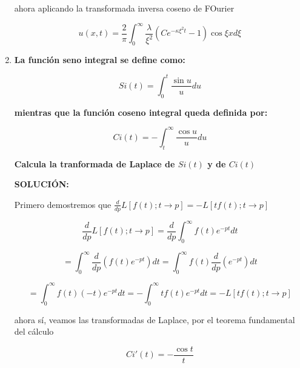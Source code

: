 \documentclass[12pt,a4paper]{article}
\begin{document}
\begin{enumerate}
    ahora aplicando la transformada inversa coseno de FOurier
    
    \begin{equation*}
        u(x,t)=\frac{2}{\pi}\int_{0}^{\infty}\frac{\lambda}{\xi^2}(Ce^{-\kappa \xi^2t}-1) \cos{\xi x} d\xi
    \end{equation*}
    
    
   
    
    
    
    
    
    \item \textbf{La función seno integral se define como:}
    
    \begin{equation*}
        Si(t)= \int_{0}^{t} \frac{\sin{u}}{u} du
    \end{equation*}
    
    \textbf{mientras que la función coseno integral queda definida por:}
    
    \begin{equation*}
        Ci(t)=-\int_{t}^{\infty}\frac{\cos{u}}{u}du
    \end{equation*}
    
    \textbf{Calcula la tranformada de Laplace de $Si(t)$ y de $Ci(t)$}
    
    \textbf{SOLUCIÓN:}
    
    Primero demostremos que $\frac{d}{dp} L[f(t);t \rightarrow p]=-L[tf(t);t \rightarrow p]$
    
    \begin{equation*}
        \frac{d}{dp} L[f(t);t \rightarrow p]=\frac{d}{dp}\int_{0}^{\infty}f(t)e^{-pt}dt
    \end{equation*}
    
    \begin{equation*}
        =\int_{0}^{\infty}\frac{d}{dp}(f(t)e^{-pt})dt=\int_{0}^{\infty}f(t)\frac{d}{dp}(e^{-pt})dt
    \end{equation*}
    
    \begin{equation*}
        =\int_{0}^{\infty}f(t)(-t)e^{-pt}dt=-\int_{0}^{\infty}tf(t)e^{-pt}dt=-L[tf(t);t \rightarrow p]
    \end{equation*}
    
    ahora sí, veamos las transformadas de Laplace, por el teorema fundamental del cálculo 

    \begin{equation*}
        Ci'(t)=-\frac{\cos{t}}{t}
    \end{equation*}
    

\end{enumerate}
\end{document}
